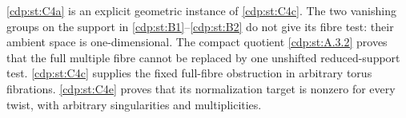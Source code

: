 \ref{cdp:st:C4a} is an explicit geometric instance of \ref{cdp:st:C4c}. The two vanishing groups on the support in \ref{cdp:st:B1}--\ref{cdp:st:B2} do not give its fibre test: their ambient space is one-dimensional. The compact quotient \ref{cdp:st:A.3.2} proves that the full multiple fibre cannot be replaced by one unshifted reduced-support test. \ref{cdp:st:C4c} supplies the fixed full-fibre obstruction in arbitrary torus fibrations. \ref{cdp:st:C4e} proves that its normalization target is nonzero for every twist, with arbitrary singularities and multiplicities.


